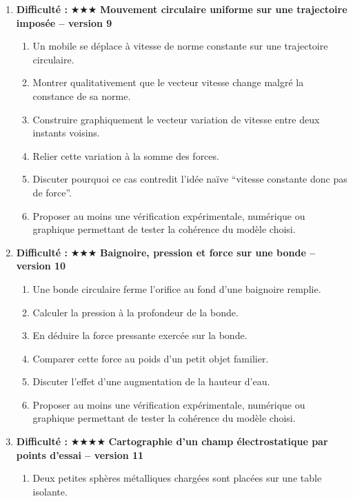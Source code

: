 \documentclass[11pt,a4paper]{article}
\newcommand{\etoiles}[1]{\textbf{Difficulté : }#1}
\begin{document}
\begin{enumerate}[label=\textbf{Problème long \arabic*.},leftmargin=*]
\begin{enumerate}[label=\alph*)]
\item Comparer un freinage doux et un freinage brutal du point de vue des transferts d'énergie.
\item Proposer au moins une vérification expérimentale, numérique ou graphique permettant de tester la cohérence du modèle choisi.
\end{enumerate}
\item \etoiles{★★★}
\textbf{Mouvement circulaire uniforme sur une trajectoire imposée -- version 9}
\begin{enumerate}[label=\alph*)]
\item Un mobile se déplace à vitesse de norme constante sur une trajectoire circulaire.
\item Montrer qualitativement que le vecteur vitesse change malgré la constance de sa norme.
\item Construire graphiquement le vecteur variation de vitesse entre deux instants voisins.
\item Relier cette variation à la somme des forces.
\item Discuter pourquoi ce cas contredit l'idée naïve ``vitesse constante donc pas de force''.
\item Proposer au moins une vérification expérimentale, numérique ou graphique permettant de tester la cohérence du modèle choisi.
\end{enumerate}
\item \etoiles{★★★}
\textbf{Baignoire, pression et force sur une bonde -- version 10}
\begin{enumerate}[label=\alph*)]
\item Une bonde circulaire ferme l'orifice au fond d'une baignoire remplie.
\item Calculer la pression à la profondeur de la bonde.
\item En déduire la force pressante exercée sur la bonde.
\item Comparer cette force au poids d'un petit objet familier.
\item Discuter l'effet d'une augmentation de la hauteur d'eau.
\item Proposer au moins une vérification expérimentale, numérique ou graphique permettant de tester la cohérence du modèle choisi.
\end{enumerate}
\item \etoiles{★★★★}
\textbf{Cartographie d'un champ électrostatique par points d'essai -- version 11}
\begin{enumerate}[label=\alph*)]
\item Deux petites sphères métalliques chargées sont placées sur une table isolante.

\end{enumerate}
\end{enumerate}
\end{document}
